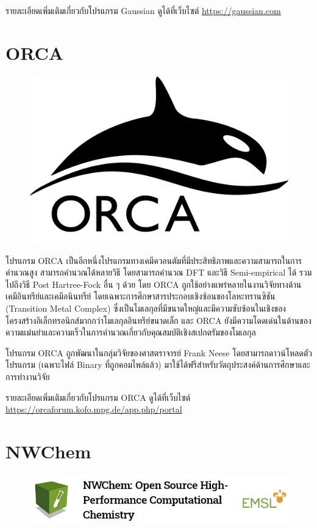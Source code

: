 รายละเอียดเพิ่มเติมเกี่ยวกับโปรแกรม Gaussian ดูได้ที่เว็บไซต์ \url{https://gaussian.com}

\section{ORCA}
\label{sec:software_orca}

\begin{figure}[H]
    \centering
    \includegraphics[width=0.4\linewidth]{fig/logo_orca.png}
    \label{fig:logo_orca}
\end{figure}

โปรแกรม ORCA เป็นอีกหนึ่งโปรแกรมทางเคมีควอนตัมที่มีประสิทธิภาพและความสามารถในการคำนวณสูง\autocite{neese2012,neese2018} 
สามารถคำนวณได้หลายวิธี โดยสามารถคำนวณ DFT และวิธี Semi-empirical ได้ รวมไปถึงวิธี Post Hartree-Fock อื่น ๆ ด้วย โดย ORCA 
ถูกใช้อย่างแพร่หลายในงานวิจัยทางด้านเคมีอินทรีย์และเคมีอนินทรีย์ โดยเฉพาะการศึกษาสารประกอบเชิงซ้อนของโลหะทรานซิชัน (Transition 
Metal Complex) ซึ่งเป็นโมเลกุลที่มีขนาดใหญ่และมีความซับซ้อนในเชิงของโครงสร้างอิเล็กทรอนิกส์มากกว่าโมเลกุลอินทรีย์ขนาดเล็ก และ ORCA 
ยังมีความโดดเด่นในด้านของความแม่นยำและความเร็วในการคำนวณเกี่ยวกับคุณสมบัติเชิงสเปกตรัมของโมเลกุล

โปรแกรม ORCA ถูกพัฒนาในกลุ่มวิจัยของศาสตราจารย์ Frank Neese โดยสามารถดาวน์โหลดตัวโปรแกรม (เฉพาะไฟล์ Binary ที่ถูกคอมไพล์แล้ว)
มาใช้ได้ฟรีสำหรับวัตถุประสงค์ด้านการศึกษาและการทำงานวิจัย 

รายละเอียดเพิ่มเติมเกี่ยวกับโปรแกรม ORCA ดูได้ที่เว็บไซต์ \url{https://orcaforum.kofo.mpg.de/app.php/portal}

\section{NWChem}
\label{sec:software_nwchem}

\begin{figure}[H]
    \centering
    \includegraphics[width=0.8\linewidth]{fig/logo_nwchem.png}
    \label{fig:logo_nwchem}
\end{figure}

